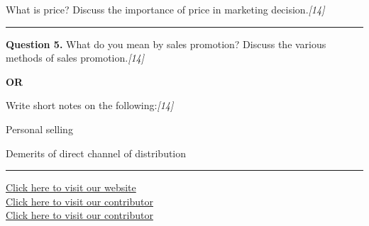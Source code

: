 \documentclass[11pt,a4paper]{article}
\newcommand{\pts}[1]{\hfill   \textit{[#1]}}
\begin{document}
What is price? Discuss the importance of price in marketing decision.\pts{14}

\medskip\rule{\linewidth}{0.2pt}




\noindent   \textbf{Question 5.}
What do you mean by sales promotion? Discuss the various methods of sales promotion.\pts{14}

\centerline{   \textbf{OR}}

Write short notes on the following:\pts{14}

\begin{parts}
  \item Personal selling
  \item Demerits of direct channel of distribution
\end{parts}

\vfill
\rule{\linewidth}{0.4pt}

\begin{center}\small
\href{https://bhu-exam.vercel.app/}{Click here to visit our website}\\[4pt]
\href{https://me-aryan.vercel.app/}{Click here to visit our contributor}\\[4pt]
\href{https://quashan-me.vercel.app/}{Click here to visit our contributor}
\end{center}
\end{document}
